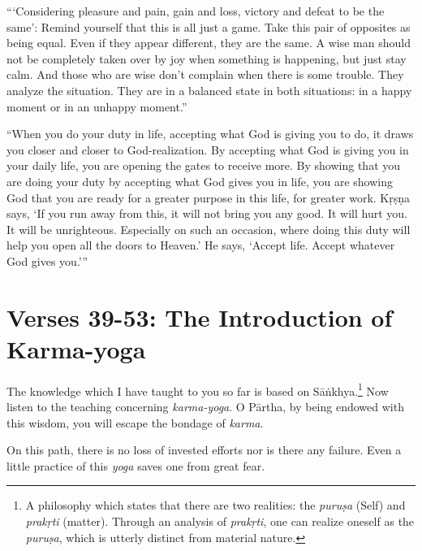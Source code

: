 \enquote{\enquote{Considering pleasure and pain, gain and loss, victory and defeat to be the same}: Remind yourself that this is all just a game. Take this pair of opposites as being equal. Even if they appear different, they are the same. A wise man should not be completely taken over by joy when something is happening, but just stay calm. And those who are wise don’t complain when there is some trouble. They analyze the situation. They are in a balanced state in both situations: in a happy moment or in an unhappy moment.}

\enquote{When you do your duty in life, accepting what God is giving you to do, it draws you closer and closer to God-realization. By accepting what God is giving you in your daily life, you are opening the gates to receive more. By showing that you are doing your duty by accepting what God gives you in life, you are showing God that you are ready for a greater purpose in this life, for greater work. Kṛṣṇa says, \enquote{If you run away from this, it will not bring you any good. It will hurt you. It will be unrighteous. Especially on such an occasion, where doing this duty will help you open all the doors to Heaven.} He says, \enquote{Accept life. Accept whatever God gives you.}}

\section{Verses 39-53: The Introduction of Karma-yoga}\label{sec-verses-39-53-the-introduction-of-karma-yoga}

{The knowledge which I have taught to you so far is based on Sāṅkhya.\footnote{A philosophy which states that there are two realities: the \textit{puruṣa} (Self) and \textit{prakṛti} (matter). Through an analysis of \textit{prakṛti}, one can realize oneself as the \textit{puruṣa}, which is utterly distinct from material nature.} Now listen to the teaching concerning \textit{karma-yoga}. O Pārtha, by being endowed with this wisdom, you will escape the bondage of \textit{karma}.}

{On this path, there is no loss of invested efforts nor is there any failure. Even a little practice of this \textit{yoga} saves one from great fear.}

